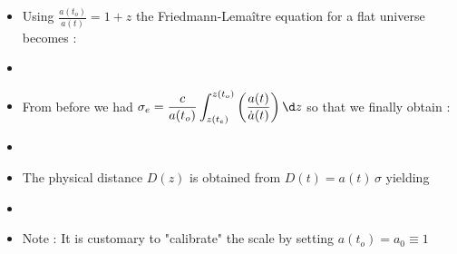 \Tr
\begin{itemize}
\item Using {\blue $\displaystyle \frac{a(t_{o})}{a(t)}=1+z$} the {\red Friedmann-Lema\^{i}tre equation
      for a flat universe} becomes :
\item[] \begin{center}
        {\red {}}
        \end{center}
\item From before we had {\blue $\displaystyle \sigma_{e}=\frac{c}{a(t_{o})}
                            \int_{z(t_{e})}^{z(t_{o})} \left(\frac{a(t)}{\dot{a}(t)}\right) \d z$}
      so that we finally obtain :
\item[] \begin{center}
        {\red {}}
        \end{center}
\item The {\blue physical distance $D(z)$} is obtained from $D(t)=a(t)\,\sigma$ yielding
\item[] \begin{center}
        {\red {}}
        \end{center}
\item[] Note : It is customary to "calibrate" the scale by setting $a(t_{o})=a_{0} \equiv 1$
\end{itemize}